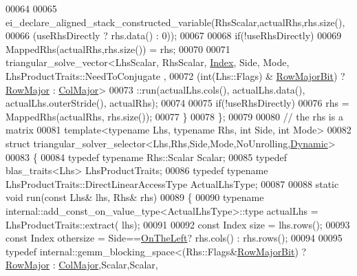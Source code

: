 \begin{DoxyCode}
00064 
00065     ei\_declare\_aligned\_stack\_constructed\_variable(RhsScalar,actualRhs,rhs.size(),
00066                                                   (useRhsDirectly ? rhs.data() : 0));
00067                                                   
00068     \textcolor{keywordflow}{if}(!useRhsDirectly)
00069       MappedRhs(actualRhs,rhs.size()) = rhs;
00070 
00071     triangular\_solve\_vector<LhsScalar, RhsScalar, \hyperlink{namespace_eigen_a62e77e0933482dafde8fe197d9a2cfde}{Index}, Side, Mode, LhsProductTraits::NeedToConjugate
      ,
00072                             (int(Lhs::Flags) & \hyperlink{group__flags_gae4f56c2a60bbe4bd2e44c5b19cbe8762}{RowMajorBit}) ? 
      \hyperlink{group__enums_ggaacded1a18ae58b0f554751f6cdf9eb13acfcde9cd8677c5f7caf6bd603666aae3}{RowMajor} : \hyperlink{group__enums_ggaacded1a18ae58b0f554751f6cdf9eb13a0cbd4bdd0abcfc0224c5fcb5e4f6669a}{ColMajor}>
00073       ::run(actualLhs.cols(), actualLhs.data(), actualLhs.outerStride(), actualRhs);
00074 
00075     \textcolor{keywordflow}{if}(!useRhsDirectly)
00076       rhs = MappedRhs(actualRhs, rhs.size());
00077   \}
00078 \};
00079 
00080 \textcolor{comment}{// the rhs is a matrix}
00081 \textcolor{keyword}{template}<\textcolor{keyword}{typename} Lhs, \textcolor{keyword}{typename} Rhs, \textcolor{keywordtype}{int} S\textcolor{keywordtype}{id}e, \textcolor{keywordtype}{int} Mode>
00082 \textcolor{keyword}{struct }triangular\_solver\_selector<Lhs,Rhs,Side,Mode,NoUnrolling,\hyperlink{namespace_eigen_ad81fa7195215a0ce30017dfac309f0b2}{Dynamic}>
00083 \{
00084   \textcolor{keyword}{typedef} \textcolor{keyword}{typename} Rhs::Scalar Scalar;
00085   \textcolor{keyword}{typedef} blas\_traits<Lhs> LhsProductTraits;
00086   \textcolor{keyword}{typedef} \textcolor{keyword}{typename} LhsProductTraits::DirectLinearAccessType ActualLhsType;
00087 
00088   \textcolor{keyword}{static} \textcolor{keywordtype}{void} run(\textcolor{keyword}{const} Lhs& lhs, Rhs& rhs)
00089   \{
00090     \textcolor{keyword}{typename} internal::add\_const\_on\_value\_type<ActualLhsType>::type actualLhs = LhsProductTraits::extract(
      lhs);
00091 
00092     \textcolor{keyword}{const} Index size = lhs.rows();
00093     \textcolor{keyword}{const} Index othersize = Side==\hyperlink{group__enums_ggac22de43beeac7a78b384f99bed5cee0ba129609b3bdf23b071f5f86cf2f995ec4}{OnTheLeft}? rhs.cols() : rhs.rows();
00094 
00095     \textcolor{keyword}{typedef} internal::gemm\_blocking\_space<(Rhs::Flags&\hyperlink{group__flags_gae4f56c2a60bbe4bd2e44c5b19cbe8762}{RowMajorBit}) ? 
      \hyperlink{group__enums_ggaacded1a18ae58b0f554751f6cdf9eb13acfcde9cd8677c5f7caf6bd603666aae3}{RowMajor} : \hyperlink{group__enums_ggaacded1a18ae58b0f554751f6cdf9eb13a0cbd4bdd0abcfc0224c5fcb5e4f6669a}{ColMajor},Scalar,Scalar,

\end{DoxyCode}
